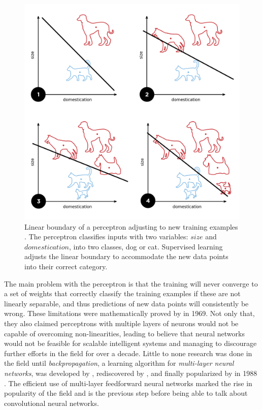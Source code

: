 \begin{figure}[htb]
  \includegraphics[width=\textwidth]{gfx/perceptron-training}
  \caption{
    Linear boundary of a perceptron adjusting to new training examples \cite{Goodspeed2015}.
    The perceptron classifies inputs with two variables: $size$ and $domestication$, into two classes, dog or cat.
    Supervised learning adjusts the linear boundary to accommodate the new data points into their correct category.
  }
  \label{fig:sec:theory:perceptron-training}
\end{figure}

The main problem with the perceptron is that the training will never converge to a set of weights that correctly classify the training examples if these are not linearly separable, and thus predictions of new data points will consistently be wrong.
These limitations were mathematically proved by \citet{Minsky1969} in 1969.
Not only that, they also claimed perceptrons with multiple layers of neurons would not be capable of overcoming non-linearities, leading to believe that neural networks would not be feasible for scalable intelligent systems and managing to discourage further efforts in the field for over a decade.
Little to none research was done in the field until \emph{backpropagation}, a learning algorithm for \emph{multi-layer neural networks}, was developed by \citet{Werbos1974}, rediscovered by \citet{Parker1985}, and finally popularized by \citet{Rumelhart1988} in 1988 \cite{Ruck1990}.
The efficient use of multi-layer feedforward neural networks marked the rise in popularity of the field and is the previous step before being able to talk about convolutional neural networks.


